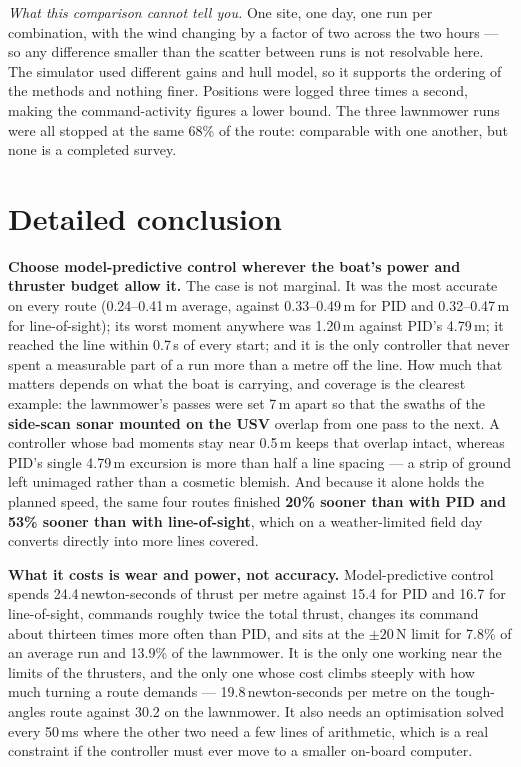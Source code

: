 \documentclass[11pt]{article}
\begin{document}
\emph{What this comparison cannot tell you.} One site, one day, one run per combination,
with the wind changing by a factor of two across the two hours --- so any difference smaller
than the scatter between runs is not resolvable here. The simulator used different gains and
hull model, so it supports the ordering of the methods and nothing finer. Positions were
logged three times a second, making the command-activity figures a lower bound. The three
lawnmower runs were all stopped at the same 68\% of the route: comparable with one another,
but none is a completed survey.

\section{Detailed conclusion}
\label{sec:conclusion}

\textbf{Choose model-predictive control wherever the boat's power and thruster budget allow
it.} The case is not marginal. It was the most accurate on every route (0.24--0.41\,m
average, against 0.33--0.49\,m for PID and 0.32--0.47\,m for line-of-sight); its worst
moment anywhere was 1.20\,m against PID's 4.79\,m; it reached the line within 0.7\,s of every
start; and it is the only controller that never spent a measurable part of a run more than a
metre off the line. How much that matters depends on what the boat is carrying, and coverage
is the clearest example: the lawnmower's passes were set 7\,m apart so that the swaths of the
\textbf{side-scan sonar mounted on the USV} overlap from one pass to the next. A controller
whose bad moments stay near 0.5\,m keeps that overlap intact, whereas PID's single 4.79\,m
excursion is more than half a line spacing --- a strip of ground left unimaged rather than a
cosmetic blemish. And because it alone holds the planned speed, the same four routes finished
\textbf{20\% sooner than with PID and 53\% sooner than with line-of-sight}, which on a
weather-limited field day converts directly into more lines covered.

\textbf{What it costs is wear and power, not accuracy.} Model-predictive control spends
24.4\,newton-seconds of thrust per metre against 15.4 for PID and 16.7 for line-of-sight,
commands roughly twice the total thrust, changes its command about thirteen times more often
than PID, and sits at the $\pm20$\,N limit for 7.8\% of an average run and 13.9\% of the
lawnmower. It is the only one working near the limits of the thrusters, and the only one
whose cost climbs steeply with how much turning a route demands --- 19.8\,newton-seconds per
metre on the tough-angles route against 30.2 on the lawnmower. It also needs an optimisation
solved every 50\,ms where the other two need a few lines of arithmetic, which is a real
constraint if the controller must ever move to a smaller on-board computer.
\end{document}
